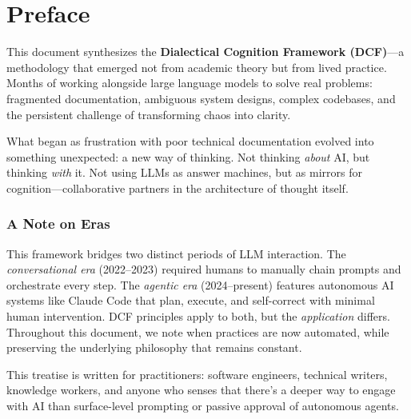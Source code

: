 \chapter*{Preface}

This document synthesizes the \textbf{Dialectical Cognition Framework (DCF)}---a methodology that emerged not from academic theory but from lived practice. Months of working alongside large language models to solve real problems: fragmented documentation, ambiguous system designs, complex codebases, and the persistent challenge of transforming chaos into clarity.

What began as frustration with poor technical documentation evolved into something unexpected: a new way of thinking. Not thinking \emph{about} AI, but thinking \emph{with} it. Not using LLMs as answer machines, but as mirrors for cognition---collaborative partners in the architecture of thought itself.

\subsection*{A Note on Eras}

This framework bridges two distinct periods of LLM interaction. The \emph{conversational era} (2022--2023) required humans to manually chain prompts and orchestrate every step. The \emph{agentic era} (2024--present) features autonomous AI systems like Claude Code that plan, execute, and self-correct with minimal human intervention. DCF principles apply to both, but the \emph{application} differs. Throughout this document, we note when practices are now automated, while preserving the underlying philosophy that remains constant.

This treatise is written for practitioners: software engineers, technical writers, knowledge workers, and anyone who senses that there's a deeper way to engage with AI than surface-level prompting or passive approval of autonomous agents.
